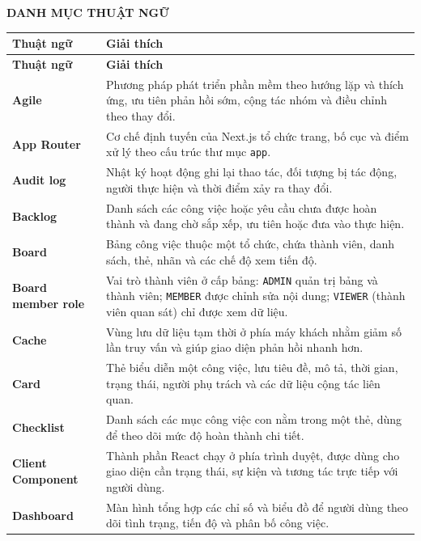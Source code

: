 \documentclass[../DoAn.tex]{subfiles}
\begin{document}
{}
\begin{center}
    \textbf{\large DANH MỤC THUẬT NGỮ}
\end{center}

\begingroup
\renewcommand{\arraystretch}{1.2}
\begin{longtable}{|p{4.2cm}|p{9.7cm}|}
    \hline
    \textbf{Thuật ngữ} & \textbf{Giải thích} \\ \hline
    \endfirsthead
    \hline
    \textbf{Thuật ngữ} & \textbf{Giải thích} \\ \hline
    \endhead

    \textbf{Agile} & Phương pháp phát triển phần mềm theo hướng lặp và thích ứng, ưu tiên phản hồi sớm, cộng tác nhóm và điều chỉnh theo thay đổi. \\ \hline
    \textbf{App Router} & Cơ chế định tuyến của Next.js tổ chức trang, bố cục và điểm xử lý theo cấu trúc thư mục \texttt{app}. \\ \hline
    \textbf{Audit log} & Nhật ký hoạt động ghi lại thao tác, đối tượng bị tác động, người thực hiện và thời điểm xảy ra thay đổi. \\ \hline
    \textbf{Backlog} & Danh sách các công việc hoặc yêu cầu chưa được hoàn thành và đang chờ sắp xếp, ưu tiên hoặc đưa vào thực hiện. \\ \hline
    \textbf{Board} & Bảng công việc thuộc một tổ chức, chứa thành viên, danh sách, thẻ, nhãn và các chế độ xem tiến độ. \\ \hline
    \textbf{Board member role} & Vai trò thành viên ở cấp bảng: \texttt{ADMIN} quản trị bảng và thành viên; \texttt{MEMBER} được chỉnh sửa nội dung; \texttt{VIEWER} (thành viên quan sát) chỉ được xem dữ liệu. \\ \hline
    \textbf{Cache} & Vùng lưu dữ liệu tạm thời ở phía máy khách nhằm giảm số lần truy vấn và giúp giao diện phản hồi nhanh hơn. \\ \hline
    \textbf{Card} & Thẻ biểu diễn một công việc, lưu tiêu đề, mô tả, thời gian, trạng thái, người phụ trách và các dữ liệu cộng tác liên quan. \\ \hline
    \textbf{Checklist} & Danh sách các mục công việc con nằm trong một thẻ, dùng để theo dõi mức độ hoàn thành chi tiết. \\ \hline
    \textbf{Client Component} & Thành phần React chạy ở phía trình duyệt, được dùng cho giao diện cần trạng thái, sự kiện và tương tác trực tiếp với người dùng. \\ \hline
    \textbf{Dashboard} & Màn hình tổng hợp các chỉ số và biểu đồ để người dùng theo dõi tình trạng, tiến độ và phân bố công việc. \\ \hline

\end{longtable}
\end{document}
